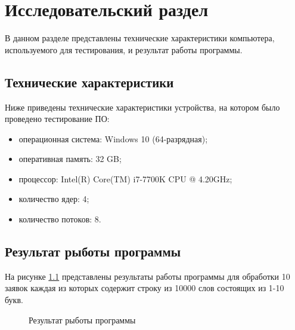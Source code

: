 \chapter{Исследовательский раздел}
В данном разделе представлены технические характеристики компьютера, используемого для тестирования, и результат работы программы.
 \section{Технические характеристики}

Ниже приведены технические характеристики устройства, на котором было проведено тестирование ПО:

\begin{itemize}
	\item операционная система: Windows 10 (64-разрядная);
	\item оперативная память: 32 GB;
	\item процессор: Intel(R) Core(TM) i7-7700K CPU @ 4.20GHz;
	\item количество ядер: 4;
	\item количество потоков: 8.
\end{itemize}

\section{Результат рыботы программы}
На рисунке \ref{results} представлены результаты работы программы для обработки 10 заявок каждая из которых содержит строку из 10000 слов состоящих из 1-10 букв.

\begin{figure}[h]
	\caption{Результат рыботы программы}
	\label{results}
\end{figure}

